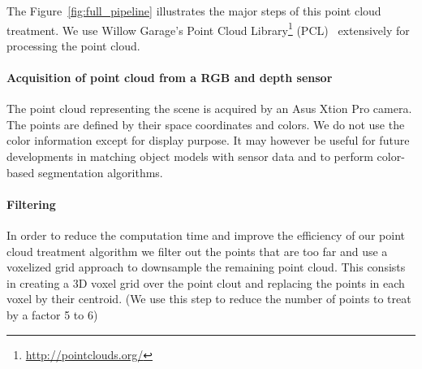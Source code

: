 The Figure~\ref{fig:full_pipeline} illustrates the major steps of this point cloud treatment.
We use Willow Garage's Point Cloud Library\footnote{\url{http://pointclouds.org/}} (PCL)~\cite{rusu:icra:2011} extensively for processing the point cloud.

\paragraph{Acquisition of point cloud from a RGB and depth sensor}
The point cloud representing the scene is acquired by an Asus Xtion Pro camera.
The points are defined by their space coordinates and colors.
We do not use the color information except for display purpose.
It may however be useful for future developments in matching object models with sensor data and to perform color-based segmentation algorithms.

\paragraph{Filtering}
In order to reduce the computation time and improve the efficiency of our point cloud treatment algorithm we filter out the points that are too far and use a voxelized grid approach to downsample the remaining point cloud.
This consists in creating a 3D voxel grid over the point clout and replacing the points in each voxel by their centroid.
(We use this step to reduce the number of points to treat by a factor 5 to 6)



